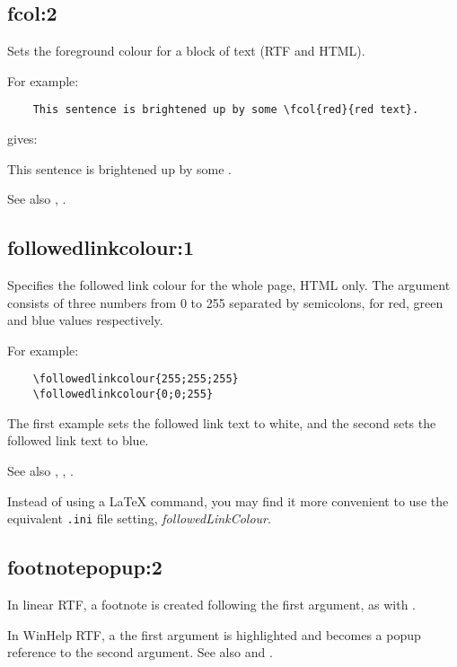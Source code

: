 \subsection*{fcol:2}\label{fcol}

Sets the foreground colour for a block of text (RTF and HTML).

For example:

\begin{verbatim}
    This sentence is brightened up by some \fcol{red}{red text}.
\end{verbatim}

gives:

This sentence is brightened up by some .

See also , .

\subsection*{followedlinkcolour:1}\label{followedlinkcolour}

Specifies the followed link colour for the whole page, HTML only. The argument consists
of three numbers from 0 to 255 separated by semicolons, for red, green and blue values respectively.

For example:

\begin{verbatim}
    \followedlinkcolour{255;255;255}
    \followedlinkcolour{0;0;255}
\end{verbatim}

The first example sets the followed link text to white, and the second sets the followed link text to blue.

See also , ,
\rtfsp{}.

Instead of using a LaTeX command, you may find it more convenient to use the equivalent {\tt .ini} file
setting, {\it followedLinkColour}.

\subsection*{footnotepopup:2}\label{footnotepopup}

In linear RTF, a footnote is created following the first argument, as with
.

In WinHelp RTF, a the first argument is highlighted and becomes
a popup reference to the second argument. See also \rtfsp
and .


